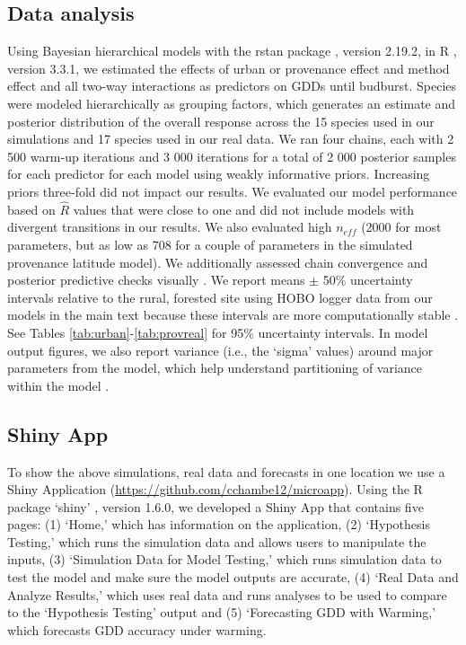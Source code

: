 \documentclass{article}\usepackage[]{graphicx}\usepackage[]{color}
\begin{document}
\subsection*{Data analysis}
Using Bayesian hierarchical models with the rstan package \citep{rstan2019}, version 2.19.2,  in R \citep{R}, version 3.3.1, we estimated the effects of urban or provenance effect and method effect and all two-way interactions as predictors on GDDs until budburst. Species were modeled hierarchically as grouping factors, which generates an estimate and posterior distribution of the overall response across the 15 species used in our simulations and 17 species used in our real data. We ran four chains, each with 2 500 warm-up iterations and 3 000 iterations for a total of 2 000 posterior samples for each predictor for each model using weakly informative priors. Increasing priors three-fold did not impact our results. We evaluated our model performance based on $\hat{R}$ values that were close to one and did not include models with divergent transitions in our results. We also evaluated high $n_{eff}$ (2000 for most parameters, but as low as 708 for a couple of parameters in the simulated provenance latitude model). We additionally assessed chain convergence and posterior predictive checks visually \citep{BDA}. We report means $\pm$ 50\% uncertainty intervals relative to the rural, forested site using HOBO logger data from our models in the main text because these intervals are more computationally stable \citep{BDA,Carpenter2017}. See Tables \ref{tab:urban}-\ref{tab:provreal} for 95\% uncertainty intervals. In model output figures, we also report variance (i.e., the `sigma' values) around major parameters from the model, which help understand partitioning of variance within the model \citep{BDA}. 

\subsection*{Shiny App}
To show the above simulations, real data and forecasts in one location we use a Shiny Application (\url{https://github.com/cchambe12/microapp}). Using the R package `shiny' \citep{shiny2021}, version 1.6.0, we developed a Shiny App that contains five pages: (1) `Home,' which has information on the application, (2) `Hypothesis Testing,' which runs the simulation data and allows users to manipulate the inputs, (3) `Simulation Data for Model Testing,' which runs simulation data to test the model and make sure the model outputs are accurate, (4) `Real Data and Analyze Results,' which uses real data and runs analyses to be used to compare to the `Hypothesis Testing' output and (5) `Forecasting GDD with Warming,' which forecasts GDD accuracy under warming. 
\end{document}
